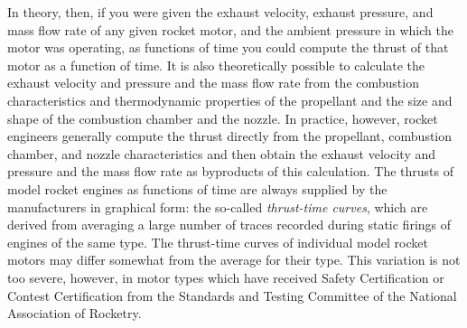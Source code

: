In theory, then, if you were given the exhaust velocity, exhaust pressure, and mass flow rate of
any given rocket motor, and the ambient pressure in which the motor was operating, as functions
of time you could compute the thrust of that motor as a function of time. It is also theoretically
possible to calculate the exhaust velocity and pressure and the mass flow rate from the
combustion characteristics and thermodynamic properties of the propellant and the size and shape
of the combustion chamber and the nozzle. In practice, however, rocket engineers generally
compute the thrust directly from the propellant, combustion chamber, and nozzle characteristics
and then obtain the exhaust velocity and pressure and the mass flow rate as byproducts of this
calculation. The thrusts of model rocket engines as functions of time are always supplied by the
manufacturers in graphical form: the so-called \emph{thrust-time curves}, which are derived from
averaging a large number of traces recorded during static firings of engines of the same type.
The thrust-time curves of individual model rocket motors may differ somewhat from the average for
their type. This variation is not too severe, however, in motor types which have received Safety
Certification or Contest Certification from the Standards and Testing Committee of the National
Association of Rocketry.

